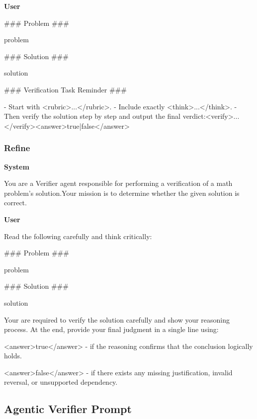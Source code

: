 \documentclass[11pt]{article}
\begin{document}
\vspace{2pt}
\noindent\textbf{User}
\begin{promptbox}
### Problem ###

{problem}

### Solution ###

{solution}

### Verification Task Reminder ###

- Start with <rubric>...</rubric>.
- Include exactly <think>...</think>.
- Then verify the solution step by step and output the final verdict:<verify>...</verify><answer>true|false</answer>
\end{promptbox}

\subsubsection{Refine}
\label{sec:appendix_refine_prompt}

\vspace{2pt}
\noindent\textbf{System}
\begin{promptbox}
You are a Verifier agent responsible for performing a verification of a math problem's solution.Your mission is to determine whether the given solution is correct.
\end{promptbox}

\vspace{2pt}
\noindent\textbf{User}
\begin{promptbox}
Read the following carefully and think critically:

### Problem ###

{problem}

### Solution ###

{solution}

Your are required to verify the solution carefully and show your reasoning process.
At the end, provide your final judgment in a single line using:

<answer>true</answer>  - if the reasoning confirms that the conclusion logically holds.

<answer>false</answer> - if there exists any missing justification, invalid reversal, or unsupported dependency.
\end{promptbox}

\subsection{Agentic Verifier Prompt}
\label{sec:appendix_ours_prompts}
\end{document}
